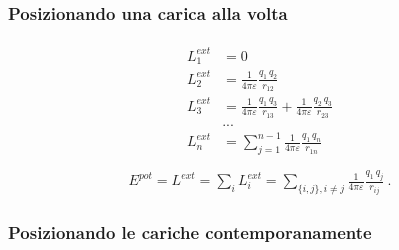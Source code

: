 \documentclass[letterpaper,10pt,italian]{jupyterBook}
\begin{document}
\sphinxAtStartPar
\subsubsection*{Posizionando una carica alla volta}
\begin{equation*}
\begin{split}\begin{aligned}
  L^{ext}_1 & = 0 \\
  L^{ext}_2 & = \frac{1}{4 \pi \varepsilon} \frac{q_1 \, q_2}{r_{12}}  \\
  L^{ext}_3 & = \frac{1}{4 \pi \varepsilon} \frac{q_1 \, q_3}{r_{13}} + \frac{1}{4 \pi \varepsilon} \frac{q_2 \, q_3}{r_{23}}  \\
            & ... \\
  L^{ext}_n & = \sum_{j=1}^{n-1} \frac{1}{4 \pi \varepsilon} \frac{q_1 \, q_n}{r_{1n}} \\
\end{aligned}\end{split}
\end{equation*}\begin{equation*}
\begin{split}E^{pot} = L^{ext} = \sum_i L^{ext}_i = \sum_{\{i, j\}, i \ne j} \frac{1}{4 \pi \varepsilon} \frac{q_1 \, q_j}{r_{ij}} \ .\end{split}
\end{equation*}\subsubsection*{Posizionando le cariche contemporanamente}
\end{document}
